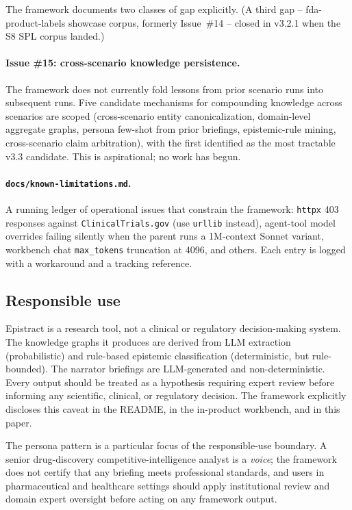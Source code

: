 The framework documents two classes of gap explicitly. (A third gap -- fda-product-labels showcase corpus, formerly Issue~\#14 -- closed in v3.2.1 when the S8 SPL corpus landed.)

\paragraph{Issue \#15: cross-scenario knowledge persistence.} The framework does not currently fold lessons from prior scenario runs into subsequent runs. Five candidate mechanisms for compounding knowledge across scenarios are scoped (cross-scenario entity canonicalization, domain-level aggregate graphs, persona few-shot from prior briefings, epistemic-rule mining, cross-scenario claim arbitration), with the first identified as the most tractable v3.3 candidate. This is aspirational; no work has begun.

\paragraph{\texttt{docs/known-limitations.md}.} A running ledger of operational issues that constrain the framework: \texttt{httpx} 403 responses against \texttt{ClinicalTrials.gov} (use \texttt{urllib} instead), agent-tool model overrides failing silently when the parent runs a 1M-context Sonnet variant, workbench chat \texttt{max\_tokens} truncation at 4096, and others. Each entry is logged with a workaround and a tracking reference.

\subsection{Responsible use}

Epistract is a research tool, not a clinical or regulatory decision-making system. The knowledge graphs it produces are derived from LLM extraction (probabilistic) and rule-based epistemic classification (deterministic, but rule-bounded). The narrator briefings are LLM-generated and non-deterministic. Every output should be treated as a hypothesis requiring expert review before informing any scientific, clinical, or regulatory decision. The framework explicitly discloses this caveat in the README, in the in-product workbench, and in this paper.

The persona pattern is a particular focus of the responsible-use boundary. A senior drug-discovery competitive-intelligence analyst is a \emph{voice}; the framework does not certify that any briefing meets professional standards, and users in pharmaceutical and healthcare settings should apply institutional review and domain expert oversight before acting on any framework output.

